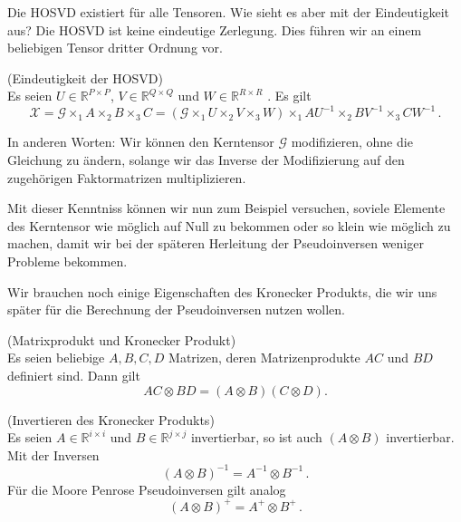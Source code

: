 Die HOSVD existiert für alle Tensoren. Wie sieht es aber mit der Eindeutigkeit aus? Die HOSVD ist keine eindeutige Zerlegung. Dies führen wir an einem beliebigen Tensor dritter Ordnung vor.

\begin{Beispiel} (Eindeutigkeit der HOSVD) \\
Es seien $U \in \mathbb{R}^{P \times P}$, $V \in \mathbb{R}^{Q \times Q}$  und $W \in \mathbb{R}^{R \times R}$ . Es gilt
\begin{equation}
{\pmb{\mathscr{X}}} = {\pmb{\mathscr{G}}} \times_1 A \times_2 B \times_3 C = ({\pmb{\mathscr{G}}} \times_1 U \times_2 V \times_3 W) \times_1 AU^{-1} \times_2 BV^{-1} \times_3 CW^{-1} \, .
\end{equation}
\end{Beispiel}

In anderen Worten: Wir können den Kerntensor ${\pmb{\mathscr{G}}}$ modifizieren, ohne die Gleichung zu ändern, solange wir das Inverse der Modifizierung auf den zugehörigen Faktormatrizen multiplizieren.

Mit dieser Kenntniss können wir nun zum Beispiel versuchen, soviele Elemente des Kerntensor wie möglich auf Null zu bekommen oder so klein wie möglich zu machen, damit wir bei der späteren Herleitung der Pseudoinversen weniger Probleme bekommen. 

Wir brauchen noch einige Eigenschaften des Kronecker Produkts, die wir uns später für die Berechnung der Pseudoinversen nutzen wollen.

\begin{Lemma} (Matrixprodukt und Kronecker Produkt) \label{lemma:prod} \\
Es seien beliebige $A,B,C,D$ Matrizen, deren Matrizenprodukte $AC$ und $BD$ definiert sind. Dann gilt
\begin{equation*}
AC \otimes BD = (A \otimes B)(C \otimes D).
\end{equation*}
\end{Lemma}

\begin{Lemma} (Invertieren des Kronecker Produkts) \\ \label{lemma:inverse}
Es seien $A \in \mathbb{R}^{i \times i}$ und $B \in \mathbb{R}^{j \times j}$ invertierbar, so ist auch $(A \otimes B)$ invertierbar. Mit der Inversen
\begin{equation*}
(A \otimes B)^{-1} = A^{-1} \otimes B^{-1} \, . 
\end{equation*}
Für die Moore Penrose Pseudoinversen gilt analog
\begin{equation*}
(A \otimes B)^{+} = A^{+} \otimes B^{+} \, .
\end{equation*}
\end{Lemma}


